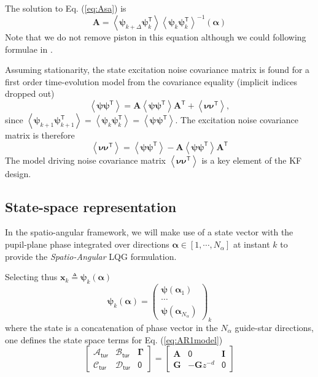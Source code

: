 \documentclass[a4paper,12pt]{article}
\newcommand{\average}[1]{\left \langle {#1} \right \rangle}
\newcommand{\T}{\mathsf{T}} %
\newcommand{\0}{\mathsf{0}} %
\newcommand{\I}{\mathbf{I}} %
\newcommand{\z}{{z}} %
\newcommand{\D}{\mathbf{G}} %
\newcommand{\Ad}{\mathcal{A}_\mathsf{tur}} %
\newcommand{\Bd}{\mathcal{B}_\mathsf{tur}} %
\newcommand{\Cd}{\mathcal{C}_\mathsf{tur}} %
\newcommand{\Dd}{\mathcal{D}_\mathsf{tur}} %
\newcommand{\Vd}{\boldsymbol{\Gamma}}
\newcommand{\alphavec}{{\boldsymbol{\alpha}}}
\newcommand{\phivec}{{\boldsymbol{\psi}}}
\newcommand{\xvec}{{\mathbf{x}}}
\newcommand{\Asa}{{\mathbf{A}}}
\begin{document}
The solution to Eq. (\ref{eq:Asa}) is 
\begin{equation}\label{Asa_Def}
\Asa = \average{\phivec_{k+\Delta}\phivec_k^\T } \average{ \phivec_k \phivec_k^\T }^{-1} (\alphavec)
\end{equation}
Note that we do not remove piston in this equation although we could following formulae in \cite{wallner83}.

Assuming stationarity, the state excitation noise covariance matrix is found for a first order time-evolution model
from the covariance equality (implicit indices dropped out)
 \begin{equation}\label{eq:state_noise_matrix}
   \average{\phivec \phivec^\T } = \Asa
   \average{ \phivec \phivec^\T }
   \Asa^\T + \average{\boldsymbol{\nu} \boldsymbol{\nu}^\T},
 \end{equation}
since $\average{\phivec_{k+1}\phivec_{k+1}^\T } = \average{ \phivec_{k} \phivec_{k}^\T } = \average{\phivec_{}\phivec_{}^\T }$. The excitation noise covariance matrix is therefore
\begin{equation}
\average{\boldsymbol{\nu} \boldsymbol{\nu}^\T} = \average{ \phivec \phivec^\T } - \Asa \average{ \phivec \phivec^\T } \Asa^\T
 \end{equation}  
The model driving noise covariance matrix $\average{\boldsymbol{\nu} \boldsymbol{\nu}^\T}$ is a key element of the KF design.

\subsection{State-space representation}

In the spatio-angular framework, we will make use of a state vector with
the pupil-plane phase integrated over directions $\alphavec \in[1, \cdots, N_\alpha]$ at instant $k$ to provide the \textit{Spatio-Angular} LQG formulation. 

Selecting thus $\xvec_{k}\triangleq \phivec_{k}(\alphavec)$ 
\begin{equation}
\phivec_{k}(\alphavec) =
\left(\begin{array}{c}
 \phivec({\alphavec_1})\\ \cdots\\ \phivec({\alphavec_{N_\alpha}})
\end{array}\right)_k
\end{equation}
where the state is a concatenation of phase vector in the $N_\alpha$ guide-star directions, 
one defines the state space terms for Eq. (\ref{eq:AR1model})
\begin{equation}\label{eq:stack_ss_c_tur_compact}
  \left[\begin{array}{c|c|c}
     \Ad & \Bd &  \Vd\\\hline
      \Cd & \Dd  & \0
    \end{array}\right]
=
\left[\begin{array}{c|c|c}
      \Asa & \0 & \I \\\hline
      \D & -\D\z^{-d} & \0
    \end{array}\right]
\end{equation}
\end{document}
